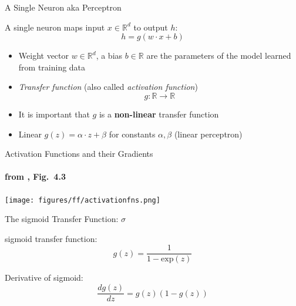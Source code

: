 \begin{frame}{A Single Neuron aka Perceptron}
\begin{block}{A single neuron maps input $x \in \mathbb{R}^d$ to output $h$:}
\[ h = g(w \cdot x + b) \]
\end{block}
\begin{itemize}[<+->]
\item Weight vector $w \in \mathbb{R}^d$, a bias $b \in \mathbb{R}$ are the parameters of the model learned from training data
\item \textit{Transfer function} (also called \textit{activation function}) 
\[ g : \mathbb{R} \rightarrow \mathbb{R} \]
\item It is important that $g$ is a \textbf{non-linear} transfer function
\item Linear $g(z) = \alpha \cdot z + \beta$ for constants $\alpha, \beta$ \pause (linear perceptron)
\end{itemize}
\end{frame}

\begin{frame}{Activation Functions and their Gradients}
\framesubtitle{from \cite{Goldberg2017}, Fig.\ 4.3}
\begin{block}{}
\centering
\texttt{[image: figures/ff/activationfns.png]}
\end{block}
\end{frame}



\begin{frame}{The sigmoid Transfer Function: $\sigma$}
\begin{block}{sigmoid transfer function:}
\[ g(z) = \frac{1}{1 - \textrm{exp}(z)} \]
\end{block}

\pause
\begin{block}{Derivative of sigmoid:}
\[ \frac{d g(z)}{dz} = g(z) (1 - g(z)) \]
\end{block}
\end{frame}
 
